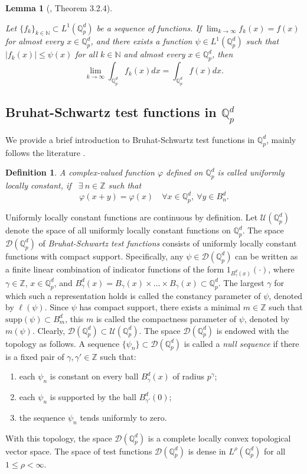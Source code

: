 \documentclass[a4paper,12pt]{amsart}
\newtheorem{lemma}[theorem]{Lemma}
\newtheorem{definition}[theorem]{Definition}
\def\Z{\mathbb{Z}}
\def\Q{\mathbb{Q}}
\def\Qp{\mathbb{Q}_p}
\newcommand{\abs}[1]{|#1|}
\newcommand{\supp}{\text{supp}}
\begin{document}
 \begin{lemma}[{\cite{AKS}, Theorem 3.2.4}]\label{LDC}

Let \(\{f_k\}_{k \in \mathbb{N}} \subset L^1(\Qp^d)\) be a sequence of functions.
If \(\lim_{k \to \infty}f_k(x)=f(x)\) for almost every \(x \in \Qp^d\), and there exists
a function \(\psi \in L^1(\Qp^d)\) such that \(\abs{f_k(x)} \leq \psi(x)\) for all \(k \in \mathbb{N}\)
and almost every \(x \in \Qp^d\), then
\[
\lim_{k \to \infty} \int_{\Qp^d} f_k(x) dx = \int_{\Qp^d} f(x) dx.
\]
\end{lemma}

\subsection{Bruhat-Schwartz test functions in $\Qp^d$}

We provide a brief introduction to  Bruhat-Schwartz test functions in \(\Qp^d\),
mainly follows the literature \cite{AKS}.
\begin{definition}
A complex-valued function $\varphi$ defined on $\Q_p^d$ is called uniformly locally constant,
if \ $\exists \ n\in\mathbb{Z}$ such that
$$
  \varphi(x+y)=\varphi(x) \quad \forall x\in\Q_p^d,\  \forall y\in B_n^d.
$$
\end{definition}
Uniformly locally constant functions are continuous by definition. Let $\mathcal{U}(\Qp^d)$ denote the
space of all uniformly locally constant functions on $\Q_p^d$.
The space $\mathcal{D}(\Qp^d)$ of {\it Bruhat-Schwartz test functions} consists of uniformly locally
constant functions with compact support. Specifically,  any $\psi\in\mathcal{D}(\Qp^d)$ can be written
as a finite linear combination of indicator functions of the form
 $1_{B_\gamma^d(x)}(\cdot)$, where $\gamma\in\Z$, $x\in\Qp^d$, and
 \(B_\gamma^d(x) = B_\gamma(x) \times \dots \times B_\gamma(x) \subset \Qp^d\).
The largest \(\gamma\) for which such a representation holds is called the constancy
parameter of \(\psi\), denoted by \(\ell(\psi)\). Since \(\psi\) has compact support,
there exists a minimal \(m \in \mathbb{Z}\) such that \(\supp(\psi) \subset B_m^d\),
this \(m\) is called the compactness parameter of \(\psi\), denoted by \(m(\psi)\).
Clearly, $\mathcal{D}(\Qp^d)\subset\mathcal{U}(\Qp^d)$.
The space $\mathcal{D}(\Qp^d)$ is endowed with the topology as follows.
A sequence $\{\psi_n\}\subset\mathcal{D}(\Qp^d)$ is called a {\it null sequence} if
there is a fixed pair of $\gamma,\gamma'\in\Z$ such that: \begin{enumerate} \item
each $\psi_n $ is constant on every ball $B_\gamma^d(x)$ of radius $p^\gamma$; \item
each $\psi_n $ is supported by the ball $B_{\gamma'}^d(0)$;\item the sequence $\psi_n $ tends uniformly to zero.
\end{enumerate}
With this topology, the space $\mathcal{D}(\Qp^d)$ is a complete locally convex topological vector space.
The space of test functions $\mathcal{D}(\Qp^d)$ is dense in \(L^\rho(\Qp^d)\) for all \(1 \leq \rho < \infty\).
\end{document}
